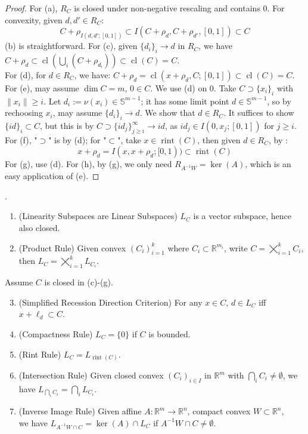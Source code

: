 \begin{proof}
	For (a), $R_C$ is closed under non-negative rescaling and contains $0$. For convexity, given $d,d'\in R_C$:
	\[
		C+\rho_{I(d,d';[0,1])}\subset I\left(C+\rho_{d},C+\rho_{d'},[0,1]\right)\subset C
	\]
	(b) is straightforward. For (c), given $\{d_i\}_i\to d$ in $R_C$, we have $C+\rho_d\subset \operatorname{cl}\left(\bigcup_i\left(C+\rho_{d_i}\right)\right)\subset \operatorname{cl}(C)=C$.\\
	For (d), for $d\in R_C$, we have: $C+\rho_d=\operatorname{cl}\left(x+\rho_d,C;[0,1]\right)\subset \operatorname{cl}(C)=C$.\\
	For (e), may assume $\dim C=m$, $0\in C$. We use (d) on $0$. Take $C\supset \{x_i\}_i$ with $\|x_i\|\geq i$. Let $d_i:=\nu(x_i)\in \mathbb{S}^{m-1}$; it has some limit point $d\in \mathbb{S}^{m-1}$, so by rechoosing $x_i$, may assume $\{d_i\}_i\to d$. We show that $d\in R_C$. It suffices to show $\{id\}_i\subset C$, but this is by $C\supset\{id_j\}_{j\geq i}^\infty\to id$, as $id_j\in I(0,x_j;[0,1])$ for $j\geq i$.\\
	For (f), "$\supset$" is by (d); for "$\subset$", take $x\in \operatorname{rint}(C)$, then given $d\in R_C$, by :
	\[
		x+\rho_d = I(x,x+\rho_d;[0, 1))\subset \operatorname{rint}(C)
	\]
	For (g), use (d). For (h), by (g), we only need $R_{A^{-1}W}=\operatorname{ker}(A)$, which is an easy application of (e).
\end{proof}

\begin{prop}.
	\label{prop:013-yoga-linearity}
	\begin{enumerate}[label=(\alph*)]
		\item (Linearity Subspaces are Linear Subspaces) $L_C$ is a vector subspace, hence also closed.
		\item (Product Rule) Given convex $(C_i)_{i=1}^k$ where $C_i\subset \mathbb{R}^{m_i}$, write $C=\bigtimes_{i=1}^kC_i$, then $L_C=\bigtimes_{i=1}^kL_{C_i}$.
	\end{enumerate}
	Assume $C$ is closed in (c)-(g).
	\begin{enumerate}[label=(\alph*)]
		\setcounter{enumi}{2}
		\item (Simplified Recession Direction Criterion) For any $x\in C$, $d\in L_C$ iff $x+\ell_d\subset C$.
		\item (Compactness Rule) $L_C=\{0\}$ if $C$ is bounded.
		\item (Rint Rule) $L_C=L_{\operatorname{rint}(C)}$.
		\item (Intersection Rule) Given closed convex $(C_i)_{i\in I}$ in $\mathbb{R}^m$ with $\bigcap_i{C_i}\neq\emptyset$, we have $L_{\bigcap_iC_i}=\bigcap_iL_{C_i}$.
		\item (Inverse Image Rule) Given affine $A:\mathbb{R}^m\to \mathbb{R}^n$, compact convex $W\subset \mathbb{R}^n$,\\we have $L_{A^{-1}W\cap C}=\operatorname{ker}(A)\cap L_C$ if $A^{-1}W\cap C\neq\emptyset$.
	\end{enumerate}
\end{prop}

